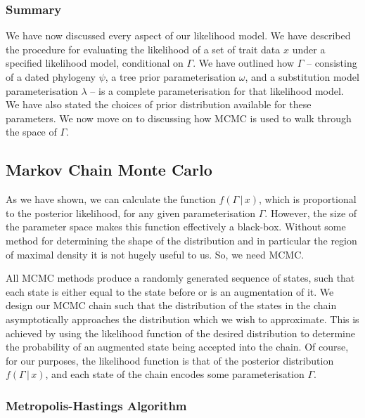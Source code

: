 \documentclass[10pt,journal,compsoc]{IEEEtran}
\begin{document}
\subsubsection{Summary}

We have now discussed every aspect of our likelihood model. We have described the procedure for evaluating the likelihood of a set of trait data $x$ under a specified likelihood model, conditional on $\Gamma$. We have outlined how $\Gamma$  -- consisting of a dated phylogeny $\psi$, a tree prior parameterisation $\omega$, and a substitution model parameterisation $\lambda$ -- is a complete parameterisation for that likelihood model. We have also stated the choices of prior distribution available for these parameters. We now move on to discussing how MCMC is used to walk through the space of $\Gamma$.

\subsection{Markov Chain Monte Carlo}

As we have shown, we can calculate the function $f(\Gamma\,|\,x)$, which is proportional to the posterior likelihood, for any given parameterisation $\Gamma$. However, the size of the parameter space makes this function effectively a black-box. Without some method for determining the shape of the distribution and in particular the region of maximal density it is not hugely useful to us. So, we need MCMC.

All MCMC methods produce a randomly generated sequence of states, such that each state is either equal to the state before or is an augmentation of it. We design our MCMC chain such that the distribution of the states in the chain asymptotically approaches the distribution which we wish to approximate. This is achieved by using the likelihood function of the desired distribution to determine the probability of an augmented state being accepted into the chain. Of course, for our purposes, the likelihood function is that of the posterior distribution $f(\Gamma\,|\,x)$, and each state of the chain encodes some parameterisation $\Gamma$.  


\subsubsection{Metropolis-Hastings Algorithm}
\end{document}
